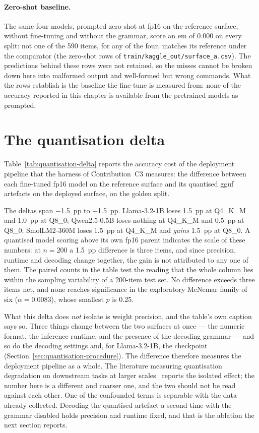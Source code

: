 \paragraph{Zero-shot baseline.} The same four models, prompted zero-shot at fp16 on the reference
surface, without fine-tuning and without the grammar, score an \gls{em} of 0.000 on every split:
not one of the 590 items, for any of the four, matches its reference under the comparator (the
zero-shot rows of \texttt{train/kaggle\_out/surface\_a.csv}). The predictions behind these rows were
not retained, so the misses cannot be broken down here into malformed output and well-formed but
wrong commands. What the rows establish is the baseline the fine-tune is measured from: none of the
accuracy reported in this chapter is available from the pretrained models as prompted.

\section{The quantisation delta}
\label{sec:quantisation-delta}

Table~\ref{tab:quantisation-delta} reports the accuracy cost of the deployment pipeline that the
harness of Contribution~C3 measures: the difference between each fine-tuned fp16 model on the
reference surface and its quantised \gls{gguf} artefacts on the deployed surface, on the golden
split.



The deltas span $-$1.5~pp to $+$1.5~pp. Llama-3.2-1B loses 1.5~pp at Q4\_K\_M and 1.0~pp at Q8\_0;
Qwen2.5-0.5B loses nothing at Q4\_K\_M and 0.5~pp at Q8\_0; SmolLM2-360M loses 1.5~pp at Q4\_K\_M
and \emph{gains} 1.5~pp at Q8\_0. A quantised model scoring above its own fp16 parent indicates the
scale of these numbers: at $n = 200$ a 1.5~pp difference is three items, and since precision,
runtime and decoding change together, the gain is not attributed to any one of them. The paired
counts in the table test the reading that the whole column lies within the sampling variability
of a 200-item test set. No difference exceeds three items net, and none reaches significance in the
exploratory McNemar family of six ($\alpha = 0.0083$), whose smallest $p$ is 0.25.

What this delta does \emph{not} isolate is weight precision, and the table's own caption says so.
Three things change between the two surfaces at once --- the numeric format, the inference runtime,
and the presence of the decoding grammar --- and so do the decoding settings and, for Llama-3.2-1B,
the checkpoint (Section~\ref{sec:quantisation-procedure}). The difference therefore measures the
deployment pipeline as a whole. The literature measuring quantisation degradation on downstream
tasks at larger scales~\cite{kurtic2025,kurt2026} reports the isolated effect; the number here is a
different and coarser one, and the two should not be read against each other. One of the confounded
terms is separable with the data already collected. Decoding the quantised artefact a second time
with the grammar disabled holds precision and runtime fixed, and that is the ablation the next
section reports.


